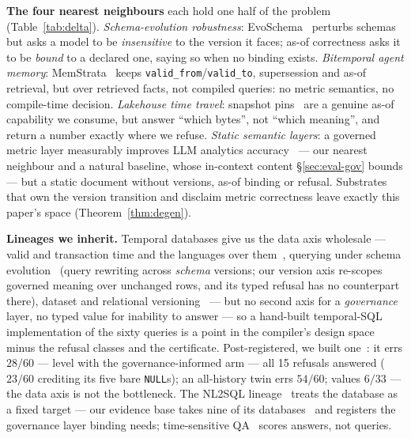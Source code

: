 \noindent{}\textbf{The four nearest neighbours} each hold one half of the problem
(Table~\ref{tab:delta}).
\emph{Schema-evolution robustness}: EvoSchema~\cite{evoschema} perturbs schemas
but asks a model to be \emph{insensitive} to the version it faces; as-of
correctness asks it to be \emph{bound} to a declared one, saying so when no
binding exists. \emph{Bitemporal agent memory}: MemStrata~\cite{memstrata} keeps
\texttt{valid\_from}/\texttt{valid\_to}, supersession and as-of retrieval, but
over retrieved facts, not compiled queries: no metric semantics, no
compile-time decision. \emph{Lakehouse time travel}: snapshot
pins~\cite{deltalake,iceberg} are a genuine as-of capability we consume, but
answer ``which bytes'', not ``which meaning'', and return a number exactly
where we refuse. \emph{Static semantic layers}: a governed metric layer measurably
improves LLM analytics accuracy~\cite{semlayerbench} --- our nearest
neighbour and a natural baseline, whose in-context content
\S\ref{sec:eval-gov} bounds --- but a static document without versions,
as-of binding or refusal. Substrates that own the version transition and
disclaim metric correctness leave exactly this paper's space
(Theorem~\ref{thm:degen}).

\smallskip\noindent{}\textbf{Lineages we inherit.} Temporal databases give us the
data axis wholesale --- valid and transaction time and the languages over
them~\cite{tquel,tsql2,tempmod,tempalign,sql2011,timelineindex}, querying under
schema evolution~\cite{primatt,prism} (query rewriting across \emph{schema}
versions; our version axis re-scopes governed meaning over unchanged rows,
and its typed refusal has no counterpart there), dataset and relational
versioning~\cite{dsversioning,orpheusdb,decibel} --- but no second axis for a
\emph{governance} layer, no typed value for inability to answer --- so a hand-built
temporal-SQL implementation of the sixty queries is a point in the compiler's
design space minus the refusal classes and the certificate. Post-registered, we
built one~\cite{asofgov-tr}: it errs $28/60$ --- level with the
governance-informed arm --- all 15 refusals answered ($23/60$ crediting its
five bare \texttt{NULL}s); an all-history twin errs $54/60$; values
$6/33$ --- the data axis is not the bottleneck. The NL2SQL lineage~\cite{seq2sql,ratsql,spider,bird,dinsql,dailsql,
nl2sqlsurvey,nl2sqltoday,solvednot} treats the database as a fixed
target --- our evidence base takes nine of its databases~\cite{spider,bird}
and registers the governance layer binding needs; time-sensitive
QA~\cite{tdbench} scores answers, not queries.

